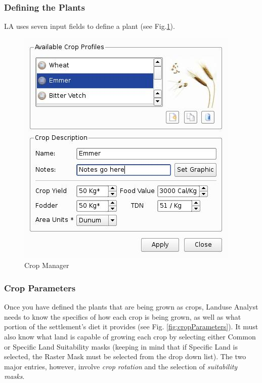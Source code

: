     \subsubsection{Defining the Plants}LA uses seven input fields to define a
      plant (see Fig.\ref{fig:cropManager}).

\begin{figure}[htbp]
  \includegraphics[scale=.6]{./images/cropManager.jpg}
  \caption{\label{fig:cropManager}Crop Manager}
\end{figure}

    \subsubsection{Crop Parameters}
    \label{cropParameters}
      Once you have defined the plants that are being grown as crops, Landuse
      Analyst needs to know the specifics of how each crop is being grown, as well
      as what portion of the settlement's diet it provides (see Fig.
      \ref{fig:cropParameters}).  It must also know what land is capable of growing
      each crop by selecting either Common or Specific Land Suitability masks
      (keeping in mind that if Specific Land is selected, the Raster Mask must be
      selected from the drop down list).  The two major entries, however, involve
      \textit{crop rotation} and the selection of \textit{suitability masks}.

